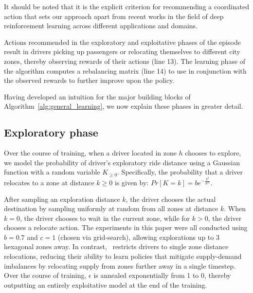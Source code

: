 It should be noted that it is the explicit criterion for recommending a 
    coordinated action that sets our
    approach apart from recent works in the field of deep reinforcement
    learning across different applications and domains.

Actions recommended in the exploratory and exploitative phases of
    the episode result in drivers picking up passengers or relocating themselves
    to different city zones, thereby observing rewards of their actions (line 13).
The learning phase of the algorithm computes a rebalancing matrix (line 14) to use
    in conjunction with the observed rewards to further improve upon the
    policy.

Having developed an intuition for the major building blocks of
    Algorithm~\ref{alg:general_learning}, we now explain these phases in 
    greater detail. 

\subsection{Exploratory phase}
Over the course of training, when a driver located in 
    zone $h$ chooses to explore, we model the probability of driver's 
    exploratory ride distance using a Gaussian function with a random variable 
    $K_{\geq 0}$. 
Specifically, the probability that a driver relocates to a zone at distance 
    $k \geq 0$ is given by:
    $Pr[K = k] = be^{-\frac{k^2}{2c^2}}$.

After sampling an exploration distance $k$, the driver chooses the actual 
    destination by sampling uniformly at random from all zones at 
    distance $k$. 
When $k=0$, the driver chooses to wait in the current zone, while for $k >0$, 
    the driver chooses a relocate action. 
The experiments in this paper were all conducted using $b=0.7$ and
    $c=1$ (chosen via grid-search), allowing explorations up to 3 hexagonal zones away.
In contrast,~\cite{Lin2018-vs} restricts drivers to single zone distance
    relocations, reducing their ability to learn policies that mitigate 
    supply-demand imbalances by relocating supply from zones further away in a
    single timestep.
Over the course of training, $\epsilon$ is annealed exponentially from
    1 to 0, thereby outputting an entirely exploitative model at the end of
    the training.

